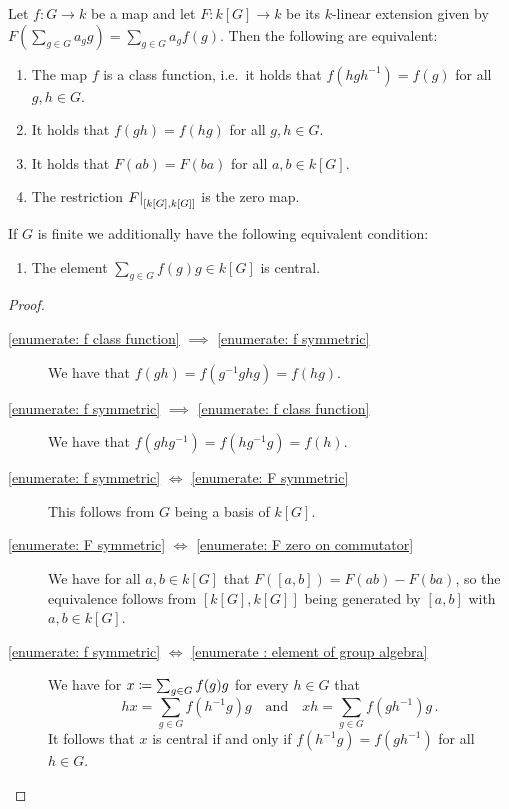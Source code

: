 \begin{lemma}
  \label{lemma: characterisation class functions}
  Let $f \colon G \to k$ be a map and let $F \colon k[G] \to k$ be its $k$-linear extension given by $F(\sum_{g \in G} a_g g) = \sum_{g \in G} a_g f(g)$.
  Then the following are equivalent:
  \begin{enumerate}
    \item
      \label{enumerate: f class function}
      The map $f$ is a class function, i.e.\ it holds that $f(h g h^{-1}) = f(g)$ for all $g, h \in G$.
    \item
      \label{enumerate: f symmetric}
      It holds that $f(gh) = f(hg)$ for all $g, h \in G$.
    \item
      \label{enumerate: F symmetric}
      It holds that $F(ab) = F(ba)$ for all $a, b \in k[G]$.
    \item
      \label{enumerate: F zero on commutator}
      The restriction $\restrict{F}{[k[G],k[G]]}$ is the zero map.
  \end{enumerate}
  If $G$ is finite we additionally have the following equivalent condition:
  \begin{enumerate}[resume]
    \item
      \label{enumerate : element of group algebra}
      The element $\sum_{g \in G} f(g) g \in k[G]$ is central.
  \end{enumerate}
\end{lemma}


\begin{proof}
  \leavevmode
  \begin{description}
    \item[\ref*{enumerate: f class function} $\implies$ \ref*{enumerate: f symmetric}]
      We have that $f(gh) = f(g^{-1} gh g) = f(hg)$.
    \item[\ref*{enumerate: f symmetric} $\implies$ \ref*{enumerate: f class function}]
      We have that $f(ghg^{-1}) = f(h g^{-1} g) = f(h)$.
    \item[\ref*{enumerate: f symmetric} $\iff$ \ref*{enumerate: F symmetric}]
      This follows from $G$ being a basis of $k[G]$.
    \item[\ref*{enumerate: F symmetric} $\iff$ \ref*{enumerate: F zero on commutator}]
      We have for all $a, b \in k[G]$ that $F([a,b]) = F(ab) - F(ba)$, so the equivalence follows from $[k[G], k[G]]$ being generated by $[a,b]$ with $a,b \in k[G]$.
    \item[\ref*{enumerate: f symmetric} $\iff$ \ref*{enumerate : element of group algebra}]
      We have for $x \coloneqq \sum_{g \in G} f(g) g$ for every $h \in G$ that
      \[
          h x
        = \sum_{g \in G} f(h^{-1} g) g
        \quad\text{and}\quad
          x h
        = \sum_{g \in G} f(g h^{-1}) g \,.
      \]
      It follows that $x$ is central if and only if $f(h^{-1} g) = f(g h^{-1})$ for all $h \in G$.
    \qedhere
  \end{description}
\end{proof}


